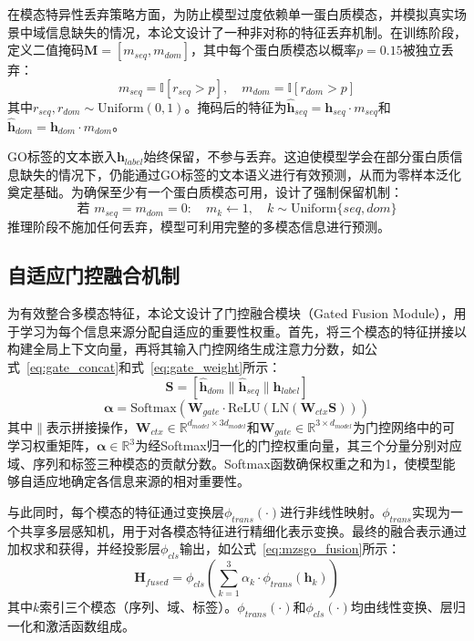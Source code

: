 在模态特异性丢弃策略方面，为防止模型过度依赖单一蛋白质模态，并模拟真实场景中域信息缺失的情况，本论文设计了一种非对称的特征丢弃机制。在训练阶段，定义二值掩码$\mathbf{M} = [m_{seq}, m_{dom}]$，其中每个蛋白质模态以概率$p = 0.15$被独立丢弃：
\begin{equation}
    m_{seq} = \mathbb{I}[r_{seq} > p], \quad m_{dom} = \mathbb{I}[r_{dom} > p]
\end{equation}
其中$r_{seq}, r_{dom} \sim \text{Uniform}(0, 1)$。掩码后的特征为$\hat{\mathbf{h}}_{seq} = \mathbf{h}_{seq} \cdot m_{seq}$和$\hat{\mathbf{h}}_{dom} = \mathbf{h}_{dom} \cdot m_{dom}$。

GO标签的文本嵌入$\mathbf{h}_{label}$始终保留，不参与丢弃。这迫使模型学会在部分蛋白质信息缺失的情况下，仍能通过GO标签的文本语义进行有效预测，从而为零样本泛化奠定基础。为确保至少有一个蛋白质模态可用，设计了强制保留机制：
\begin{equation}
    \text{若 } m_{seq} = m_{dom} = 0: \quad m_k \leftarrow 1, \quad k \sim \text{Uniform}\{seq, dom\}
\end{equation}
推理阶段不施加任何丢弃，模型可利用完整的多模态信息进行预测。

\subsection{自适应门控融合机制}

为有效整合多模态特征，本论文设计了门控融合模块（Gated Fusion Module），用于学习为每个信息来源分配自适应的重要性权重。首先，将三个模态的特征拼接以构建全局上下文向量，再将其输入门控网络生成注意力分数，如公式~\eqref{eq:gate_concat}和式~\eqref{eq:gate_weight}所示：
\begin{equation}
\label{eq:gate_concat}
    \mathbf{S} = [\hat{\mathbf{h}}_{dom} \parallel \hat{\mathbf{h}}_{seq} \parallel \mathbf{h}_{label}]
\end{equation}
\begin{equation}
\label{eq:gate_weight}
    \boldsymbol{\alpha} = \text{Softmax}(\mathbf{W}_{gate} \cdot \text{ReLU}(\text{LN}(\mathbf{W}_{ctx}\mathbf{S})))
\end{equation}
其中$\parallel$表示拼接操作，$\mathbf{W}_{ctx} \in \mathbb{R}^{d_{model} \times 3d_{model}}$和$\mathbf{W}_{gate} \in \mathbb{R}^{3 \times d_{model}}$为门控网络中的可学习权重矩阵，$\boldsymbol{\alpha} \in \mathbb{R}^{3}$为经Softmax归一化的门控权重向量，其三个分量分别对应域、序列和标签三种模态的贡献分数。Softmax函数确保权重之和为1，使模型能够自适应地确定各信息来源的相对重要性。

与此同时，每个模态的特征通过变换层$\phi_{trans}(\cdot)$进行非线性映射。$\phi_{trans}$实现为一个共享多层感知机，用于对各模态特征进行精细化表示变换。最终的融合表示通过加权求和获得，并经投影层$\phi_{cls}$输出，如公式~\eqref{eq:mzsgo_fusion}所示：
\begin{equation}
\label{eq:mzsgo_fusion}
    \mathbf{H}_{fused} = \phi_{cls}\left(\sum_{k=1}^{3} \alpha_k \cdot \phi_{trans}(\mathbf{h}_k)\right)
\end{equation}
其中$k$索引三个模态（序列、域、标签）。$\phi_{trans}(\cdot)$和$\phi_{cls}(\cdot)$均由线性变换、层归一化和激活函数组成。

